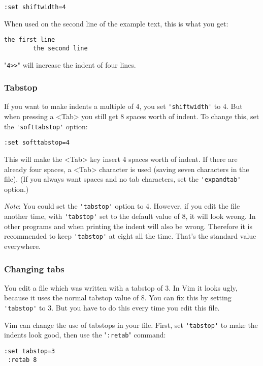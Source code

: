\begin{Verbatim}[samepage=true]
 :set shiftwidth=4
\end{Verbatim}

When used on the second line of the example text, this is what you get:

\begin{Verbatim}[samepage=true]
    the first line 
        the second line 
\end{Verbatim}

"\verb!4>>!" will increase the indent of four lines.
\subsubsection{Tabstop}
If you want to make indents a multiple of 4, you set \verb!'shiftwidth'! to 4.
But when pressing a <Tab> you still get 8 spaces worth of indent.
To change this, set the \verb!'softtabstop'! option:

\begin{Verbatim}[samepage=true]
 :set softtabstop=4
\end{Verbatim}

This will make the <Tab> key insert 4 spaces worth of indent.
If there are already four spaces, a <Tab> character is used (saving seven characters in the file).
(If you always want spaces and no tab characters, set the \verb!'expandtab'! option.)

\emph{Note}: You could set the \verb!'tabstop'! option to 4.
However, if you edit the file another time, with \verb!'tabstop'! set to the default value of 8, it will look wrong.
In other programs and when printing the indent will also be wrong.
Therefore it is recommended to keep \verb!'tabstop'! at eight all the time.
That's the standard value everywhere.

\subsubsection{Changing tabs}
You edit a file which was written with a tabstop of 3.
In Vim it looks ugly, because it uses the normal tabstop value of 8.
You can fix this by setting \verb!'tabstop'! to 3.
But you have to do this every time you edit this file.

Vim can change the use of tabstops in your file.
First, set \verb!'tabstop'! to make the indents look good, then use the "\verb!:retab!" command:

\begin{Verbatim}[samepage=true]
 :set tabstop=3
 :retab 8
\end{Verbatim}

